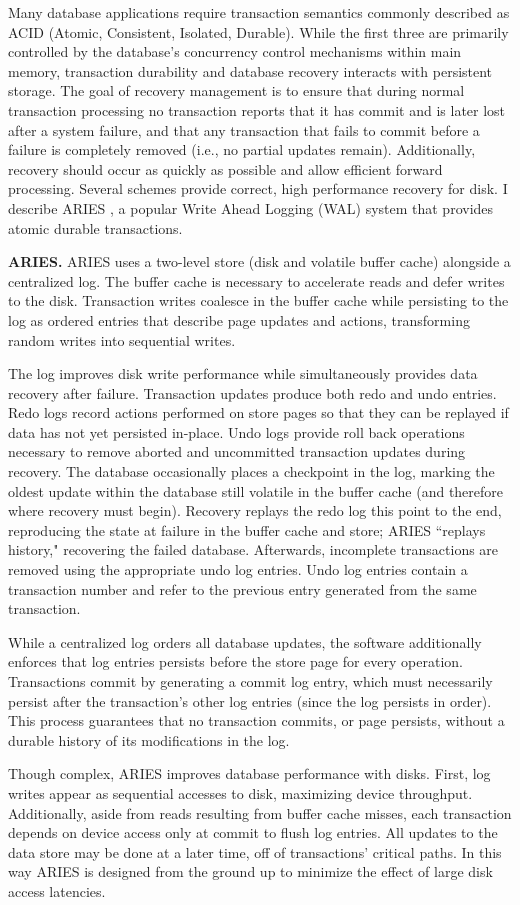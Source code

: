 Many database applications require transaction semantics commonly described as ACID (Atomic, Consistent, Isolated, Durable).
While the first three are primarily controlled by the database's concurrency control mechanisms within main memory, transaction durability and database recovery interacts with persistent storage.
The goal of recovery management is to ensure that during normal transaction processing no transaction reports that it has commit and is later lost after a system failure, and that any transaction that fails to commit before a failure is completely removed (i.e., no partial updates remain).
Additionally, recovery should occur as quickly as possible and allow efficient forward processing.
Several schemes provide correct, high performance recovery for disk.
I describe ARIES \cite{MohanHaderle92}, a popular Write Ahead Logging (WAL) system that provides atomic durable transactions.

\textbf{ARIES.}
ARIES uses a two-level store (disk and volatile buffer cache) alongside a centralized log.
The buffer cache is necessary to accelerate reads and defer writes to the disk.
Transaction writes coalesce in the buffer cache while persisting to the log as ordered entries that describe page updates and actions, transforming random writes into sequential writes.

The log improves disk write performance while simultaneously provides data recovery after failure.
Transaction updates produce both redo and undo entries.
Redo logs record actions performed on store pages so that they can be replayed if data has not yet persisted in-place.
Undo logs provide roll back operations necessary to remove aborted and uncommitted transaction updates during recovery.
The database occasionally places a checkpoint in the log, marking the oldest update within the database still volatile in the buffer cache (and therefore where recovery must begin).
Recovery replays the redo log this point to the end, reproducing the state at failure in the buffer cache and store; ARIES ``replays history," recovering the failed database.
Afterwards, incomplete transactions are removed using the appropriate undo log entries.
Undo log entries contain a transaction number and refer to the previous entry generated from the same transaction.

While a centralized log orders all database updates, the software additionally enforces that log entries persists before the store page for every operation.
Transactions commit by generating a commit log entry, which must necessarily persist after the transaction's other log entries (since the log persists in order).
This process guarantees that no transaction commits, or page persists, without a durable history of its modifications in the log.

Though complex, ARIES improves database performance with disks.
First, log writes appear as sequential accesses to disk, maximizing device throughput.
Additionally, aside from reads resulting from buffer cache misses, each transaction depends on device access only at commit to flush log entries.
All updates to the data store may be done at a later time, off of transactions' critical paths.
In this way ARIES is designed from the ground up to minimize the effect of large disk access latencies.
